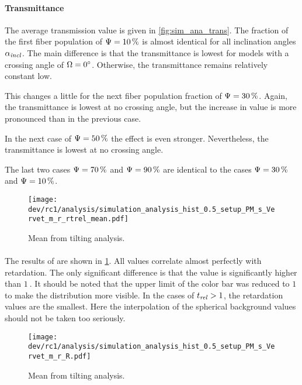 \paragraph{Transmittance}
The average transmission value is given in \cref{fig:sim_ana_trans}.
The fraction of the first fiber population of $\textnormal{$\Psi$}=\SI{10}{\percent}$ is almost identical for all inclination angles $\textnormal{$\alpha_{\mathit{incl}}$}$.
The main difference is that the transmittance is lowest for models with a crossing angle of $\textnormal{$\Omega$} = \SI{0}{\degree}$.
Otherwise, the transmittance remains relatively constant low.
\par
%
This changes a little for the next fiber population fraction of $\textnormal{$\Psi$}=\SI{30}{\percent}$.
Again, the transmittance is lowest at no crossing angle, but the increase in value is more pronounced than in the previous case.
\par
%
In the next case of $\textnormal{$\Psi$}=\SI{50}{\percent}$ the effect is even stronger.
Nevertheless, the transmittance is lowest at no crossing angle.
\par
%
The last two cases $\textnormal{$\Psi$}=\SI{70}{\percent}$ and $\textnormal{$\Psi$}=\SI{90}{\percent}$ are identical to the cases $\textnormal{$\Psi$}=\SI{30}{\percent}$ and $\textnormal{$\Psi$}=\SI{10}{\percent}$.
%
%
%
\begin{figure}[!p]
\centering
\texttt{[image: dev/rc1/analysis/simulation\_analysis\_hist\_0.5\_setup\_PM\_s\_Vervet\_m\_r\_rtrel\_mean.pdf]}
\caption{Mean \trel{} from tilting analysis. }
\label{fig:sim_ana_trel}
\end{figure}
%
\paragraph{\trel}
The results of \trel{} are shown in \cref{fig:sim_ana_trel}.
All values correlate almost perfectly with retardation.
The only significant difference is that the \trel{} value is significantly higher than $\SI{1}{}$.
It should be noted that the upper limit of the color bar was reduced to $\SI{1}{}$ to make the distribution more visible.
In the cases of $\textnormal{$t_\mathit{rel}$} > \SI{1}{}$, the retardation values are the smallest.
Here the interpolation of the spherical background values should not be taken too seriously.
%
%
%
\begin{figure}[!p]
\centering
\texttt{[image: dev/rc1/analysis/simulation\_analysis\_hist\_0.5\_setup\_PM\_s\_Vervet\_m\_r\_R.pdf]}
\caption{Mean \rvalue{} from tilting analysis. }
\label{fig:sim_ana_rvalue}
\end{figure}
%
